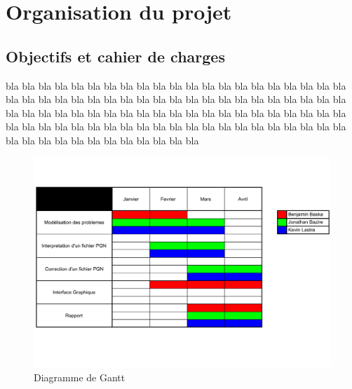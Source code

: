 \documentclass{article}
\begin{document}
\section{Organisation du projet}
\subsection{Objectifs et cahier de charges}
bla bla bla bla bla bla bla bla bla bla bla bla bla bla bla bla bla bla bla bla bla bla bla bla bla bla bla bla bla bla bla bla bla bla bla bla bla bla bla bla bla bla bla bla bla bla bla bla bla bla bla bla bla bla bla bla bla bla bla bla bla bla bla bla bla bla bla bla bla bla bla bla bla bla bla bla bla bla bla bla bla bla bla bla bla bla bla bla bla bla bla bla bla bla bla bla
\begin{figure}[!h]
\centering
\includegraphics[scale=0.15]{Images/Graph01.png}
\caption{Diagramme de Gantt}
\end{figure}
\newpage
\end{document}
